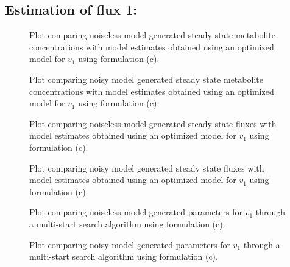 \documentclass[10pt]{report}
\begin{document}
	\subsection{Estimation of flux 1:}
	\begin{figure}[!tbhp]
		\caption{Plot comparing noiseless model generated steady state metabolite concentrations with model estimates obtained using an optimized model for $v_1$ using formulation (c). }
	\end{figure}
	\begin{figure}[!tbhp]
		\caption{Plot comparing noisy model generated steady state metabolite concentrations with model estimates obtained using an optimized model for $v_1$ using formulation (c). }
	\end{figure}
	\begin{figure}[!tbhp]
		\caption{Plot comparing noiseless model generated steady state fluxes with model estimates obtained using an optimized model for $v_1$ using formulation (c). }
	\end{figure}
	\begin{figure}[!tbhp]
		\caption{Plot comparing noisy model generated steady state fluxes with model estimates obtained using an optimized model for $v_1$ using formulation (c). }
	\end{figure}
	\begin{figure}[!tbhp]
		\caption{Plot comparing noiseless model generated parameters for $v_1$ through a multi-start search algorithm using formulation (c). }
	\end{figure}
	\begin{figure}[!tbhp]
		\caption{Plot comparing noisy model generated parameters for $v_1$ through a multi-start search algorithm using formulation (c). }
	\end{figure}
	\clearpage
\end{document}

